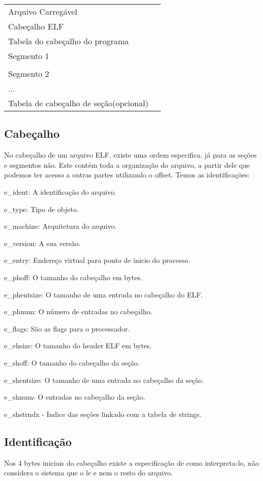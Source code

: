\begin{list}{}
\item {\begin{tabular}{|l|c|}
\hline
Arquivo Carregável &\tabularnewline
\cline{1-1}
Cabeçalho ELF & \tabularnewline
\cline{1-1}
Tabela do cabeçalho do programa & \tabularnewline
\cline{1-1} 
Segmento 1 & \tabularnewline
\cline{1-1} 
 & \tabularnewline
\cline{1-1}
Segmento 2 & \tabularnewline
\cline{1-1}
... & \tabularnewline
\cline{1-1}
Tabela de cabeçalho de seção(opcional) & \tabularnewline
\cline{1-1}
\end{tabular}}
\end{list}


\subsection{Cabeçalho}
   No cabeçalho de um arquivo ELF, existe uma ordem especifica, já para as seções e segmentos não.
   Este contém toda a organização do arquivo, a partir dele que podemos ter acesso a outras partes utilizando o offset.
   Temos as identificações:

   e\_ident: A identificação do arquivo.

   e\_type: Tipo de objeto.

   e\_machine: Arquitetura do arquivo.
   
   e\_version: A sua versão.
  
   e\_entry: Endereço virtual para ponto de inicio do processo.
   
   e\_phoff: O tamanho do cabeçalho em bytes.
   
   e\_phentsize: O tamanho de uma entrada no cabeçalho do ELF.
   
   e\_phnum: O número de entradas no cabeçalho.
   
   e\_flags: São as flags para o processador.
   
   e\_ehsize: O tamanho do header ELF em bytes.
   
   e\_shoff: O tamanho do cabeçalho da seção.
   
   e\_shentsize: O tamanho de uma entrada no cabeçalho da seção.

   e\_shnum- O entradas no cabeçalho da seção.
   
   e\_shstrndx - Indice das seções linkado com a tabela de strings.


\subsection {Identificação}
  Nos 4 bytes iniciais do cabeçalho existe a especificação de como interpreta-lo, não considera o sistema que o le e nem o resto do arquivo.
